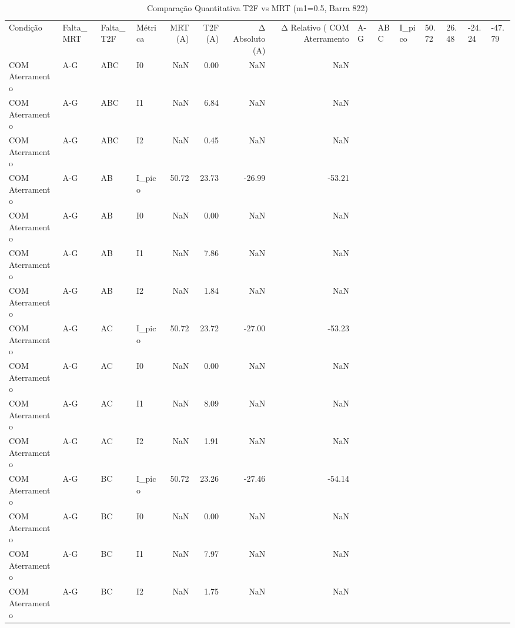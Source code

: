 \begin{table}[htbp]
\centering
\caption{Comparação Quantitativa T2F vs MRT (m1=0.5, Barra 822)}
\label{tab:comparacao_t2f_mrt_cap4}
\begin{tabular}{llllrrrr}
\toprule
Condição & Falta_MRT & Falta_T2F & Métrica & MRT (A) & T2F (A) & Δ Absoluto (A) & Δ Relativo (%
\midrule
COM Aterramento & A-G & ABC & I_pico & 50.72 & 26.48 & -24.24 & -47.79 \\
COM Aterramento & A-G & ABC & I0 & NaN & 0.00 & NaN & NaN \\
COM Aterramento & A-G & ABC & I1 & NaN & 6.84 & NaN & NaN \\
COM Aterramento & A-G & ABC & I2 & NaN & 0.45 & NaN & NaN \\
COM Aterramento & A-G & AB & I_pico & 50.72 & 23.73 & -26.99 & -53.21 \\
COM Aterramento & A-G & AB & I0 & NaN & 0.00 & NaN & NaN \\
COM Aterramento & A-G & AB & I1 & NaN & 7.86 & NaN & NaN \\
COM Aterramento & A-G & AB & I2 & NaN & 1.84 & NaN & NaN \\
COM Aterramento & A-G & AC & I_pico & 50.72 & 23.72 & -27.00 & -53.23 \\
COM Aterramento & A-G & AC & I0 & NaN & 0.00 & NaN & NaN \\
COM Aterramento & A-G & AC & I1 & NaN & 8.09 & NaN & NaN \\
COM Aterramento & A-G & AC & I2 & NaN & 1.91 & NaN & NaN \\
COM Aterramento & A-G & BC & I_pico & 50.72 & 23.26 & -27.46 & -54.14 \\
COM Aterramento & A-G & BC & I0 & NaN & 0.00 & NaN & NaN \\
COM Aterramento & A-G & BC & I1 & NaN & 7.97 & NaN & NaN \\
COM Aterramento & A-G & BC & I2 & NaN & 1.75 & NaN & NaN \\
\bottomrule
\end{tabular}
\end{table}
